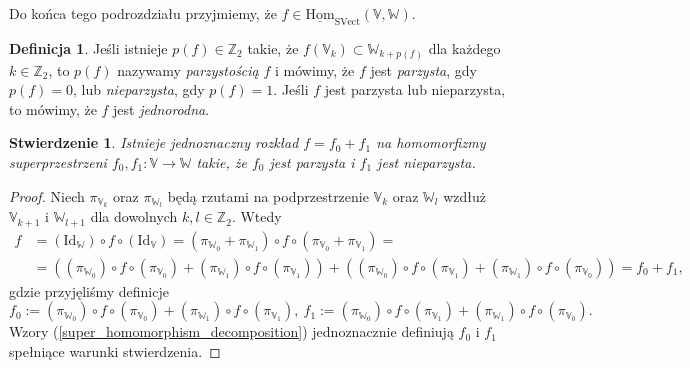 \documentclass[11pt,a4paper]{report}
\newtheorem{proposition}[theorem]{Stwierdzenie}
\theoremstyle{definition}
\newtheorem{definition}[theorem]{Definicja}
\begin{document}
Do końca tego podrozdziału przyjmiemy, że $f \in \underline{\mathrm{Hom}}_{\mathrm{SVect}}(\mathbb{V},\mathbb{W})$.

\begin{definition}
Jeśli istnieje $p(f) \in \mathbb{Z}_2$ takie, że $f(\mathbb{V}_k) \subset \mathbb{W}_{k+p(f)}$ dla każdego $k \in \mathbb{Z}_2$, to $p(f)$ nazywamy \textit{parzystością} $f$ i mówimy, że $f$ jest \textit{parzysta}, gdy $p(f)=0$, lub \textit{nieparzysta}, gdy $p(f)=1$. Jeśli $f$ jest parzysta lub nieparzysta, to mówimy, że $f$ jest \textit{jednorodna}.
\end{definition}

\begin{proposition}
\label{super_homomorphism_decomposition_proposition}
Istnieje jednoznaczny rozkład $f = f_0 + f_1$ na homomorfizmy superprzestrzeni $f_0, f_1: \mathbb{V} \rightarrow \mathbb{W}$ takie, że $f_0$ jest parzysta i $f_1$ jest nieparzysta.
\end{proposition}

\begin{proof} Niech $\pi_{\mathbb{V}_k}$ oraz $\pi_{\mathbb{W}_l}$ będą rzutami na podprzestrzenie $\mathbb{V}_k$ oraz $\mathbb{W}_l$ wzdłuż $\mathbb{V}_{k+1}$ i $\mathbb{W}_{l+1}$ dla dowolnych $k,l \in \mathbb{Z}_2$. Wtedy
\begin{equation*} 
\begin{aligned}
f &= (\textrm{Id}_\mathbb{W}) \!\circ\! f \!\circ \!(\textrm{Id}_\mathbb{V}) = (\pi_{\mathbb{W}_0} + \pi_{\mathbb{W}_1}) \!\circ\! f \!\circ \! (\pi_{\mathbb{V}_0} + \pi_{\mathbb{V}_1}) = \\
&= ((\pi_{\mathbb{W}_0}) \!\circ\! f \!\circ \! (\pi_{\mathbb{V}_0}) + (\pi_{\mathbb{W}_1}) \!\circ\! f \!\circ \! (\pi_{\mathbb{V}_1})) + ((\pi_{\mathbb{W}_0}) \!\circ\! f \!\circ \! (\pi_{\mathbb{V}_1}) + (\pi_{\mathbb{W}_1}) \!\circ\! f \!\circ \! (\pi_{\mathbb{V}_0})) = f_0 + f_1,
\end{aligned}
\end{equation*}
gdzie przyjęliśmy definicje 
\begin{equation}
\label{super_homomorphism_decomposition}
f_0 := (\pi_{\mathbb{W}_0}) \!\circ\! f \!\circ \! (\pi_{\mathbb{V}_0}) + (\pi_{\mathbb{W}_1}) \!\circ\! f \!\circ \! (\pi_{\mathbb{V}_1}),\ f_1 := (\pi_{\mathbb{W}_0}) \!\circ\! f \!\circ \! (\pi_{\mathbb{V}_1}) + (\pi_{\mathbb{W}_1}) \!\circ\! f \!\circ \! (\pi_{\mathbb{V}_0}).
\end{equation}
Wzory (\ref{super_homomorphism_decomposition}) jednoznacznie definiują $f_0$ i $f_1$ spełniące warunki stwierdzenia.
\end{proof}
\end{document}
